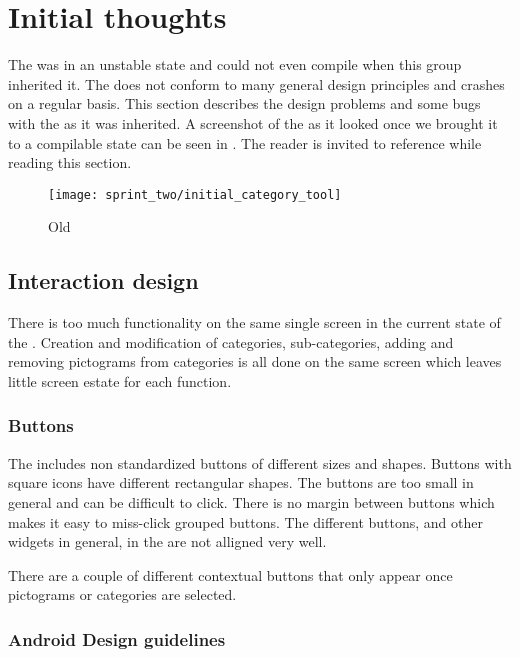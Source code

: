 \section{Initial thoughts}

The \ct was in an unstable state and could not even compile when this group inherited it. The \ct does not conform to many general design principles and crashes on a regular basis. This section describes the design problems and some bugs with the \ct as it was inherited. A screenshot of the \ct as it looked once we brought it to a compilable state can be seen in . The reader is invited to reference  while reading this section.

\begin{figure}[!htbp]
    \centering
    \texttt{[image: sprint\_two/initial\_category\_tool]}
    \caption{Old \ct}
    \label{fig:category_tool_old}
\end{figure}

\subsection{Interaction design}

There is too much functionality on the same single screen in the current state of the \ct. Creation and modification of categories, sub-categories, adding and removing pictograms from categories is all done on the same screen which leaves little screen estate for each function.  

\subsubsection{Buttons}

The \ct includes non standardized buttons of different sizes and shapes. Buttons with square icons have different rectangular shapes. The buttons are too small in general and can be difficult to click. There is no margin between buttons which makes it easy to miss-click grouped buttons.   
The different buttons, and other widgets in general, in the \ct are not alligned very well.

There are a couple of different contextual buttons that only appear once pictograms or categories are selected. 

\subsubsection{Android Design guidelines}

